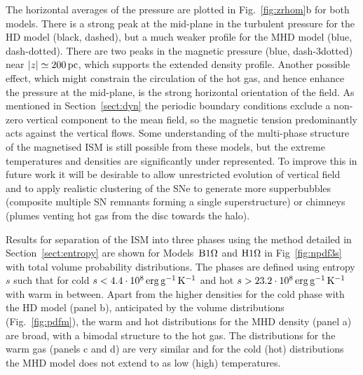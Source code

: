   The horizontal averages of the pressure are plotted in Fig.~\ref{fig:zrhom}b
  for both models. 
  There is a strong peak at the mid-plane in the turbulent pressure for the HD
  model (black, dashed), but a much weaker profile for the MHD model (blue,
  dash-dotted). 
  There are two peaks in the magnetic pressure (blue, dash-3dotted) near 
  $|z|\simeq200\,{\rm pc}$, which supports the extended density profile.
  Another possible effect, which might constrain the circulation of the hot
  gas, and hence enhance the pressure at the mid-plane, is the strong 
  horizontal orientation of the field.
  As mentioned in Section~\ref{sect:dyn} the periodic boundary conditions
  exclude a non-zero vertical component to the mean field, so the magnetic
  tension predominantly acts against the vertical flows.
  Some understanding of the multi-phase structure of the magnetised ISM is
  still possible from these models, but the extreme temperatures and densities
  are significantly under represented.
  To improve this in future work it will be desirable to allow unrestricted 
  evolution of vertical field and to apply realistic clustering of the 
  SNe to generate more supperbubbles (composite multiple SN remnants forming a
  single superstructure) or chimneys (plumes venting hot gas from the disc 
  towards the halo).

  Results for separation of the ISM into three phases using the method 
  detailed in Section~\ref{sect:entropy} are shown for Models~${\mathrm{B}1\rm{\Omega} }$ and
  ${\mathrm{H}1\rm{\Omega}}$ in Fig~\ref{fig:npdf3s} with total volume probability distributions.
  The phases are defined using entropy $s$ such that for cold 
  $s<4.4\cdot10^{8}\,{\rm erg} \,{\rm g}^{-1}\,{\rm K}^{-1}$ and hot 
  $s>23.2\cdot10^{8}\,{\rm erg} \,{\rm g}^{-1}\,{\rm K}^{-1}$ with warm in between.
  Apart from the higher densities for the cold phase with the HD model (panel 
  b), 
  anticipated by the volume distributions (Fig.~\ref{fig:pdfm}), the warm and
  hot distributions for the MHD density (panel a) are broad, with a bimodal 
  structure to the hot gas. 
  The distributions for the warm gas (panels c and d) are very similar and for the
  cold (hot) distributions the MHD model does not extend to as low (high)
  temperatures. 
  
